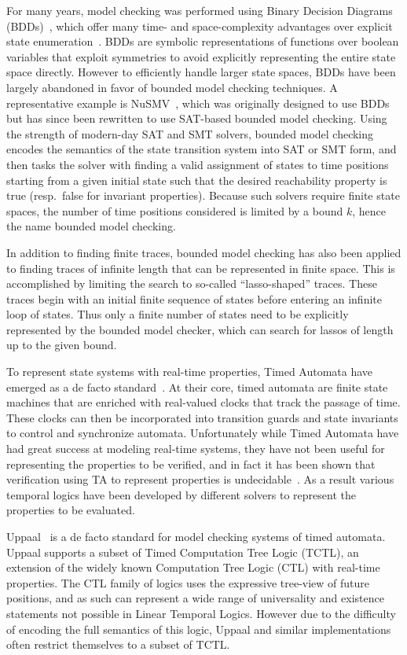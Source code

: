 \documentclass[a4paper,11pt]{report}
\theoremstyle{definition}
\begin{document}
For many years, model checking was performed using Binary Decision Diagrams
(BDDs)~\cite{bryant86}, which offer many time- and space-complexity advantages
over explicit state enumeration~\cite{burch92}. BDDs are symbolic
representations of functions over boolean variables that exploit symmetries to
avoid explicitly representing the entire state space directly. However to
efficiently handle larger state spaces, BDDs have been largely abandoned in
favor of bounded model checking techniques. A representative example is
NuSMV~\cite{cimatti02}, which was originally designed to use BDDs but has since
been rewritten to use SAT-based bounded model checking. Using the strength of
modern-day SAT and SMT solvers, bounded model checking encodes the semantics of
the state transition system into SAT or SMT form, and then tasks the solver with
finding a valid assignment of states to time positions starting from a given
initial state such that the desired reachability property is true (resp.\ false
for invariant properties). Because such solvers require finite state spaces, the
number of time positions considered is limited by a bound $k$, hence the name
bounded model checking.

In addition to finding finite traces, bounded model checking has also been
applied to finding traces of infinite length that can be represented in finite
space. This is accomplished by limiting the search to so-called ``lasso-shaped''
traces. These traces begin with an initial finite sequence of states before
entering an infinite loop of states. Thus only a finite number of states need to
be explicitly represented by the bounded model checker, which can search for
lassos of length up to the given bound.

To represent state systems with real-time properties, Timed Automata have
emerged as a de facto standard~\cite{alur94}. At their core, timed automata are
finite state machines that are enriched with real-valued clocks that track the
passage of time. These clocks can then be incorporated into transition guards
and state invariants to control and synchronize automata. Unfortunately while
Timed Automata have had great success at modeling real-time systems, they have
not been useful for representing the properties to be verified, and in fact it
has been shown that verification using TA to represent properties is
undecidable~\cite{alur94}. As a result various temporal logics have been
developed by different solvers to represent the properties to be evaluated.

Uppaal~\cite{larsen97} is a de facto standard for model checking systems of timed
automata. Uppaal supports a subset of Timed Computation Tree Logic (TCTL), an
extension of the widely known Computation Tree Logic (CTL) with real-time
properties. The CTL family of logics uses the expressive tree-view of future
positions, and as such can represent a wide range of universality and existence
statements not possible in Linear Temporal Logics. However due to the difficulty
of encoding the full semantics of this logic, Uppaal and similar implementations
often restrict themselves to a subset of TCTL.
\end{document}

